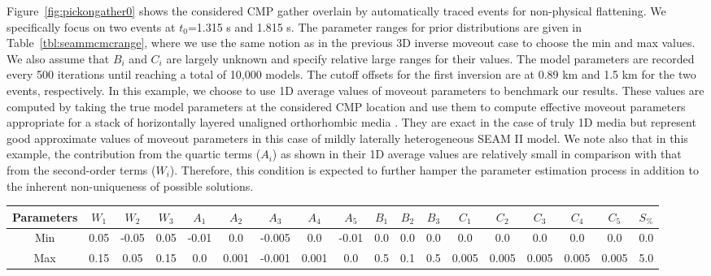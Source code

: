 
Figure~\ref{fig:pickongather0} shows the considered CMP gather overlain by automatically traced events for non-physical flattening. We specifically focus on two events at $t_0$=1.315 s and 1.815 s. The parameter ranges for prior distributions are given in Table~\ref{tbl:seammcmcrange}, where we use the same notion as in the previous 3D inverse moveout case to choose the min and max values. We also assume that $B_i$ and $C_i$ are largely unknown and specify relative large ranges for their values. The model parameters are recorded every 500 iterations until reaching a total of 10,000 models. The cutoff offsets for the first inversion are at 0.89 km and 1.5 km for the two events, respectively. In this example, we choose to use 1D average values of moveout parameters to benchmark our results. These values are computed by taking the true model parameters at the considered CMP location and use them to compute effective moveout parameters appropriate for a stack of horizontally layered unaligned orthorhombic media \cite[]{zoneinterval,korenravvetriclinic}. They are exact in the case of truly 1D media but represent good approximate values of moveout parameters in this case of mildly laterally heterogeneous SEAM II model. We note also that in this example, the contribution from the quartic terms ($A_i$) as shown in their 1D average values are relatively small in comparison with that from the second-order terms ($W_i$). Therefore, this condition is expected to further hamper the parameter estimation process in addition to the inherent non-uniqueness of possible solutions.


{
\centering
    \resizebox{\textwidth}{!}
    {
     \begin{tabular}{|c|c|c|c|c|c|c|c|c|c|c|c|c|c|c|c|c|c|}
     	     \hline  Parameters &  $W_1$ & $W_2$ & $W_3$ & $A_1$ & $A_2$ & $A_3$ & $A_4$ & $A_5$ & $B_1$ & $B_2$ & $B_3$ & $C_1$ & $C_2$ & $C_3$ & $C_4$ & $C_5$ & $S_{\%}$ \\ 
     	     \hline Min & 0.05 & -0.05 & 0.05 & -0.01 & 0.0 & -0.005 & 0.0 & -0.01 & 0.0 & 0.0 & 0.0 & 0.0 & 0.0 & 0.0 & 0.0 & 0.0 & 0.0\\
     	     \hline Max & 0.15 & 0.05 & 0.15 & 0.0 & 0.001 & -0.001 & 0.001 & 0.0 & 0.5 & 0.1 & 0.5 & 0.005 & 0.005 & 0.005 &0.005 & 0.005  & 5.0\\
     	     \hline
    \end{tabular}
    }
}

